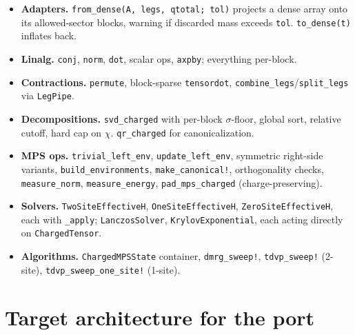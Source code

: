 \documentclass[11pt]{article}
\begin{document}
\begin{itemize}[leftmargin=2em]
\item \textbf{Adapters.} \texttt{from\_dense(A, legs, qtotal; tol)} projects a
      dense array onto its allowed-sector blocks, warning if discarded mass
      exceeds \texttt{tol}.  \texttt{to\_dense(t)} inflates back.
\item \textbf{Linalg.} \texttt{conj}, \texttt{norm}, \texttt{dot}, scalar
      ops, \texttt{axpby}; everything per-block.
\item \textbf{Contractions.} \texttt{permute}, block-sparse
      \texttt{tensordot}, \texttt{combine\_legs}/\texttt{split\_legs} via
      \texttt{LegPipe}.
\item \textbf{Decompositions.} \texttt{svd\_charged} with per-block
      $\sigma$-floor, global sort, relative cutoff, hard cap on $\chi$.
      \texttt{qr\_charged} for canonicalization.
\item \textbf{MPS ops.} \texttt{trivial\_left\_env}, \texttt{update\_left\_env},
      symmetric right-side variants, \texttt{build\_environments},
      \texttt{make\_canonical!}, orthogonality checks, \texttt{measure\_norm},
      \texttt{measure\_energy}, \texttt{pad\_mps\_charged} (charge-preserving).
\item \textbf{Solvers.} \texttt{TwoSiteEffectiveH}, \texttt{OneSiteEffectiveH},
      \texttt{ZeroSiteEffectiveH}, each with \texttt{\_apply};
      \texttt{LanczosSolver}, \texttt{KrylovExponential}, each acting
      directly on \texttt{ChargedTensor}.
\item \textbf{Algorithms.} \texttt{ChargedMPSState} container,
      \texttt{dmrg\_sweep!}, \texttt{tdvp\_sweep!} (2-site),
      \texttt{tdvp\_sweep\_one\_site!} (1-site).
\end{itemize}

\section{Target architecture for the port}
\end{document}
